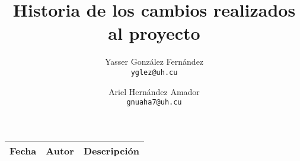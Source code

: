 \documentclass{article}
\title{Historia de los cambios realizados al proyecto}
\author{
  Yasser González Fernández \\
  \small{\texttt{yglez@uh.cu}}
  \and
  Ariel Hernández Amador \\
  \small{\texttt{gnuaha7@uh.cu}}
}
\date{}
\begin{document}
\maketitle

\begin{center}
\begin{tabular}{|l|l|p{20em}|}
\hline 
\textbf{Fecha} & \textbf{Autor} & \textbf{Descripción} \\ 
\hline

\end{tabular}
\end{center}
\end{document}
